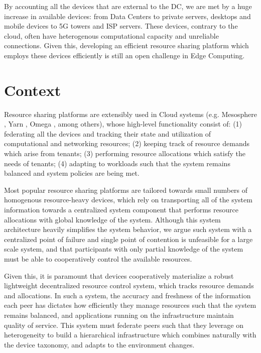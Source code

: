By accounting all the devices that are external to the DC, we are met by a huge increase in available devices: from Data Centers to private servers, desktops and mobile devices to 5G towers and ISP servers. These devices, contrary to the cloud, often have heterogenous computational capacity and unreliable connections. Given this, developing an efficient resource sharing platform which employs these devices efficiently is still an open challenge in Edge Computing. 

\section{Context}

Resource sharing platforms are extensibly used in Cloud systems (e.g. Mesosphere \cite{hindman2011mesos}, Yarn \cite{Vavilapalli2013ApacheHY}, Omega \cite{41684}, among others), whose high-level functionality consist of: (1) federating all the devices and tracking their state and utilization of computational and networking resources; (2) keeping track of resource demands which arise from tenants; (3) performing resource allocations which satisfy the needs of tenants; (4) adapting to workloads such that the system remains balanced and system policies are being met.

Most popular resource sharing platforms are tailored towards small numbers of homogenous resource-heavy devices, which rely on transporting all of the system information towards a centralized system component that performs resource allocations with global knowledge of the system. Although this system architecture heavily simplifies the system behavior, we argue such system with a centralized point of failure and single point of contention is unfeasible for a large scale system, and that participants with only partial knowledge of the system must be able to cooperatively control the available resources. 

Given this, it is paramount that devices cooperatively materialize a robust lightweight decentralized resource control system, which tracks resource demands and allocations. In such a system, the accuracy and freshness of the information each peer has dictates how efficiently they manage resources such that the system remains balanced, and applications running on the infrastructure maintain quality of service. This system must federate peers such that they leverage on heterogeneity to build a hierarchical infrastructure which combines naturally with the device taxonomy, and adapts to the environment changes. 

